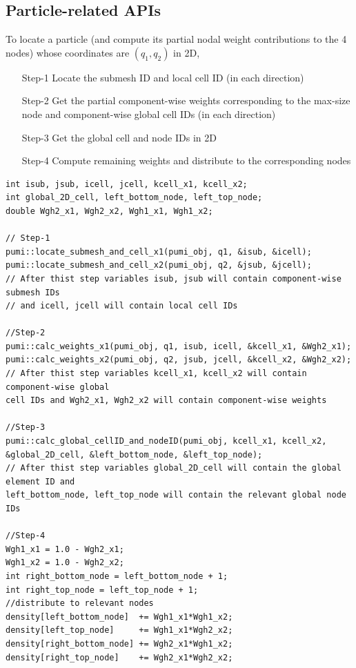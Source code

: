 \documentclass[a4paper,12pt]{article}
\begin{document}
\subsection{Particle-related APIs}
To locate a particle (and compute its partial nodal weight contributions to the 4 nodes) whose coordinates are $(q_1,q_2)$ in 2D, 
\begin{itemize}
	\item [Step-1] Locate the submesh ID and local cell ID (in each direction)
	\item [Step-2] Get the partial component-wise weights corresponding to the max-size node and component-wise global cell IDs (in each direction)
	\item [Step-3] Get the global cell and node IDs in 2D
	\item [Step-4] Compute remaining weights and distribute to the corresponding nodes
\end{itemize}
\begin{verbatim}
int isub, jsub, icell, jcell, kcell_x1, kcell_x2;
int global_2D_cell, left_bottom_node, left_top_node;
double Wgh2_x1, Wgh2_x2, Wgh1_x1, Wgh1_x2;

// Step-1
pumi::locate_submesh_and_cell_x1(pumi_obj, q1, &isub, &icell);
pumi::locate_submesh_and_cell_x2(pumi_obj, q2, &jsub, &jcell);
// After thist step variables isub, jsub will contain component-wise submesh IDs
// and icell, jcell will contain local cell IDs

//Step-2
pumi::calc_weights_x1(pumi_obj, q1, isub, icell, &kcell_x1, &Wgh2_x1);
pumi::calc_weights_x2(pumi_obj, q2, jsub, jcell, &kcell_x2, &Wgh2_x2);
// After thist step variables kcell_x1, kcell_x2 will contain component-wise global
cell IDs and Wgh2_x1, Wgh2_x2 will contain component-wise weights

//Step-3
pumi::calc_global_cellID_and_nodeID(pumi_obj, kcell_x1, kcell_x2, 
&global_2D_cell, &left_bottom_node, &left_top_node);
// After thist step variables global_2D_cell will contain the global element ID and
left_bottom_node, left_top_node will contain the relevant global node IDs 

//Step-4
Wgh1_x1 = 1.0 - Wgh2_x1;
Wgh1_x2 = 1.0 - Wgh2_x2;
int right_bottom_node = left_bottom_node + 1;
int right_top_node = left_top_node + 1;
//distribute to relevant nodes
density[left_bottom_node]  += Wgh1_x1*Wgh1_x2;
density[left_top_node]     += Wgh1_x1*Wgh2_x2;
density[right_bottom_node] += Wgh2_x1*Wgh1_x2;
density[right_top_node]    += Wgh2_x1*Wgh2_x2;

\end{verbatim}
\end{document}
